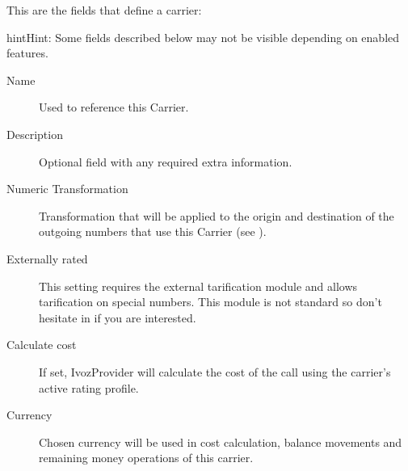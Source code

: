 \documentclass[letterpaper,10pt,english]{sphinxmanual}
\begin{document}
This are the fields that define a carrier:

\begin{notice}{hint}{Hint:}
Some fields described below may not be visible depending on enabled features.
\end{notice}
\begin{description}
\item[{Name}] \leavevmode{}\label{administration_portal/brand/providers/carriers:term-name}
Used to reference this Carrier.

\item[{Description}] \leavevmode{}\label{administration_portal/brand/providers/carriers:term-description}
Optional field with any required extra information.

\item[{Numeric Transformation}] \leavevmode{}\label{administration_portal/brand/providers/carriers:term-numeric-transformation}
Transformation that will be applied to the origin and destination of the
outgoing numbers that use this Carrier
(see {\hyperref[administration_portal/brand/settings/numeric_transformations:numeric\string-transformations]{}}).

\item[{Externally rated}] \leavevmode{}\label{administration_portal/brand/providers/carriers:term-externally-rated}
This setting requires the external tarification module and allows
tarification on special numbers. This module is not standard so don't
hesitate in {\hyperref[basic_concepts/intro/getting_help:getting\string-help]{}} if you are interested.

\item[{Calculate cost}] \leavevmode{}\label{administration_portal/brand/providers/carriers:term-calculate-cost}
If set, IvozProvider will calculate the cost of the call using the carrier's active rating profile.

\item[{Currency}] \leavevmode{}\label{administration_portal/brand/providers/carriers:term-currency}
Chosen currency will be used in cost calculation, balance movements and
remaining money operations of this carrier.


\end{description}
\end{document}
